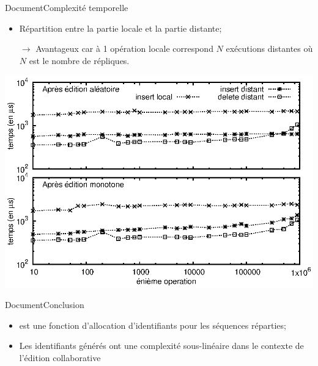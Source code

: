 \begin{frame}{Document}{Complexité temporelle}

  \begin{center}
    
  \end{center}
  
  \vspace{0.5cm}\hspace{-1cm}  
  \begin{minipage}{0.51\textwidth}
    \begin{itemize}
    \item Répartition entre la partie locale et la partie distante;
    \item [$\rightarrow$] Avantageux car à 1 opération locale correspond $N$
      exécutions distantes où $N$ est le nombre de répliques.
    \end{itemize}    
  \end{minipage}
  \hfill
  \begin{minipage}{0.48\textwidth}
    \includegraphics[width=1.2\textwidth]{img/replication/time.eps}
  \end{minipage}

  
\end{frame}

\begin{frame}{Document}{Conclusion}

  \begin{itemize}
  \item \LSEQ est une fonction d'allocation d'identifiants pour les séquences
    réparties;
    \vspace{0.5cm}
  \item Les identifiants générés ont une complexité sous-linéaire dans le contexte
    de l'édition collaborative
  \end{itemize}
  
\end{frame}


